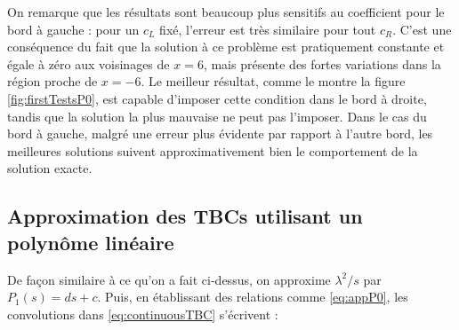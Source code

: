 \indent On remarque que les résultats sont beaucoup plus sensitifs au coefficient pour le bord à gauche : pour un $c_L$ fixé, l'erreur est très similaire pour tout $c_R$. C'est une conséquence du fait que la solution à ce problème est pratiquement constante et égale à zéro aux voisinages de $x = 6$, mais présente des fortes variations dans la région proche de  $x = -6$. Le meilleur résultat, comme le montre la figure \ref{fig:firstTestsP0}, est capable d'imposer cette condition dans le bord à droite, tandis que la solution la plus mauvaise ne peut pas l'imposer. Dans le cas du bord à gauche, malgré une erreur plus évidente par rapport à l'autre bord, les meilleures solutions suivent approximativement bien le comportement de la solution exacte.

\subsection{Approximation des TBCs utilisant un polynôme linéaire}

\indent De façon similaire à ce qu'on a fait ci-dessus, on approxime $\lambda^2/s$ par $P_1(s) = ds + c$. Puis, en établissant des relations comme \eqref{eq:appP0}, les convolutions dans \eqref{eq:continuousTBC} s'écrivent :

